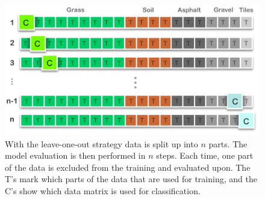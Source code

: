 



\begin{figure}[h]
	\centering
	\includegraphics[scale=0.7]{figs_temp/loo.jpg}
	\caption{With the leave-one-out strategy data is split up into $n$ parts. The model evaluation is then performed in $n$ steps. Each time, one part of the data is excluded from the training and evaluated upon. The T's mark which parts of the data that are used for training, and the C's show which data matrix is used for classification.}
	\label{fig:loo}
\end{figure}


